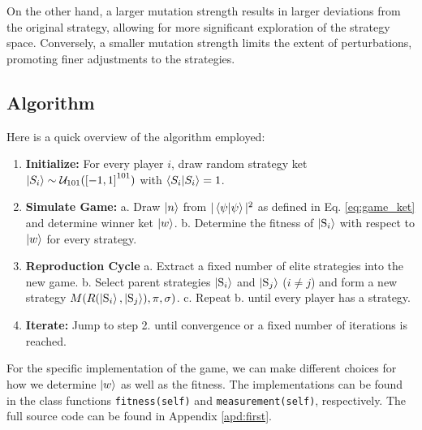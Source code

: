 On the other hand, a larger mutation strength results in larger deviations from the original strategy, allowing for more significant exploration of the strategy space. Conversely, a smaller mutation strength limits the extent of perturbations, promoting finer adjustments to the strategies.\\

\subsection{Algorithm}

Here is a quick overview of the algorithm employed:
\begin{enumerate}
\item \textbf{Initialize:} For every player $i$, draw random strategy ket $\ket{S_i} \sim \mathcal{U}_{101}(\left[-1, 1\right]^{101})$ with $\braket{S_i|S_i}=1$.
\item \textbf{Simulate Game:}
\subitem \hspace{-0.7cm}a. Draw $\ket{n}$ from $|\braket{\psi|\psi}|^2$ as defined in Eq. \ref{eq:game_ket} and determine winner ket $\ket{w}$.
\subitem \hspace{-0.7cm}b. Determine the fitness of $\ket{\text{S}_i}$ with respect to $\ket{w}$ for every strategy.
\item \textbf{Reproduction Cycle}
\subitem \hspace{-0.7cm}a. Extract a fixed number of elite strategies into the new game.
\subitem \hspace{-0.7cm}b. Select parent strategies $\ket{\text{S}_i}$ and $\ket{\text{S}_j}$ ($i \neq j$) and form a new strategy $M(R(\ket{\text{S}_i}, \ket{\text{S}_j}), \pi, \sigma)$.
\subitem \hspace{-0.7cm}c. Repeat b. until every player has a strategy.
\item \textbf{Iterate:} Jump to step 2. until convergence or a fixed number of iterations is reached.
\end{enumerate}

For the specific implementation of the game, we can make different choices for how we determine $\ket{w}$ as well as the fitness. The implementations can be found in the class functions \texttt{fitness(self)} and \texttt{measurement(self)}, respectively. The full source code can be found in Appendix \ref{apd:first}.




